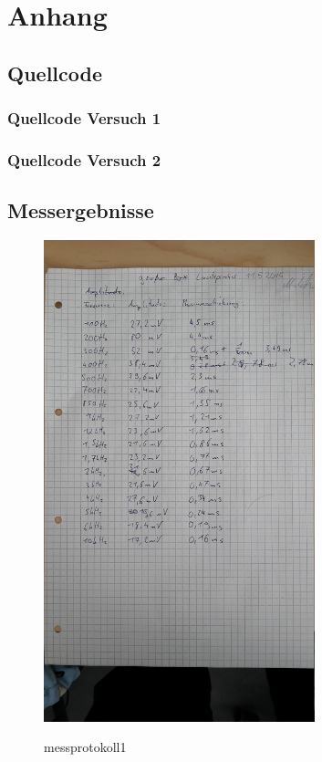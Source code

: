 \documentclass[TGAI_Laborbericht.tex]{subfiles}
\begin{document}
\chapter*{Anhang}
\label{chap:APPENDIX}
\addtocounter{chapter}{1}
\setcounter{section}{0}

\section{Quellcode}
\label{chap:APPENDIX_SOURCECODE}

\subsection{Quellcode Versuch 1}
\label{chap:APPENDIX_SOURCECODE_V1}



\subsection{Quellcode Versuch 2}
\label{chap:APPENDIX_SOURCECODE_V2}




\section{Messergebnisse}
\label{chap:APPENDIX_MEASUREMENT_SOURCE}

\begin{figure}[H]
	\includegraphics[width=0.7\textwidth]{media/messprotokoll1.jpg}
	\label{messprotokoll1}
	\caption{messprotokoll1}
\end{figure}
\end{document}
